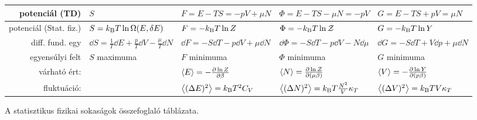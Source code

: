 \begin{landscape}
\begin{table}[!p]
{\begin{tabular}{r||l|l|l|l}
     potenciál (TD)
      & $S$ 
      & $F=E-TS=-pV+\mu N$ 
      & $\Phi=E-TS-\mu N=-pV$ 
      & $G=E-TS+pV=\mu N$\\ \hline
     potenciál (Stat. fiz.) 
      & $S=k_\text{B} T \ln \Omega(E,\delta E)$ 
      & $F=-k_\text{B} T\ln Z$ 
      & $\Phi=-k_\text{B} T\ln \mathcal{Z}$ 
      & $G=-k_\text{B} T\ln Y$\\ \hline
     diff. fund. egy 
      & $\dd S=\frac{1}{T}\dd E+\frac{p}{T}\dd V-\frac{\mu}{T}\dd N$
      & $\dd F=-S\dd T-p\dd V+\mu\dd N$
      & $\dd \Phi=-S\dd T-p\dd V-N\dd \mu$
      & $\dd G=-S\dd T+V\dd p+\mu\dd N$\\ \hline
     egyensúlyi felt
      & $S$ maximuma
      & $F$ minimuma
      & $\Phi$ minimuma
      & $G$ minimuma \\ \hline
     várható ért:
      & 
      & $\left\langle E\right\rangle=-\frac{\partial \ln Z}{\partial \beta}$
      & $\left\langle N\right\rangle=\frac{\partial \ln \mathcal{Z}}{\partial (\mu\beta)}$
      & $\left\langle V\right\rangle=-\frac{\partial \ln Y}{\partial (p\beta)}$\\ \hline
     fluktuáció:
      &
      & $\left\langle(\Delta E)^2\right\rangle=k_\text{B} T^2 C_V$
      & $\left\langle(\Delta N)^2\right\rangle=k_\text{B} T \frac{N^2}{V} \kappa_T$
      & $\left\langle(\Delta V)^2\right\rangle=k_\text{B} T V \kappa_T$
    \end{tabular}}
    \begin{center}
     {A statisztikus fizikai sokaságok összefoglaló táblázata.}
    \end{center}
   \end{table}
  \end{landscape} 
